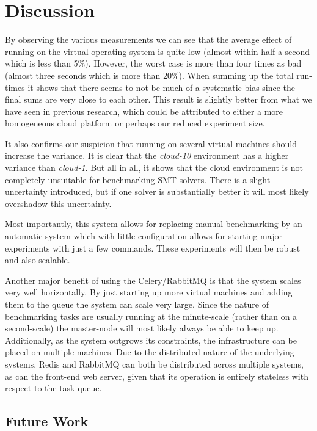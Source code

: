 \documentclass[a4paper]{IEEEtran}
\begin{document}
\section{Discussion}
By observing the various measurements we can see that the average
effect of running on the virtual operating system is quite low (almost
within half a second which is less than 5\%). However, the worst case
is more than four times as bad (almost three seconds which is more
than 20\%). When summing up the total run-times it shows that there
seems to not be much of a systematic bias since the final sums are
very close to each other. This result is slightly better from what we
have seen in previous research, which could be attributed to either a
more homogeneous cloud platform or perhaps our reduced experiment size.

It also confirms our suspicion that running on several virtual
machines should increase the variance. It is clear that the
\emph{cloud-10} environment has a higher variance than
\emph{cloud-1}. But all in all, it shows that the cloud environment is
not completely unsuitable for benchmarking SMT solvers. There is a
slight uncertainty introduced, but if one solver is substantially
better it will most likely overshadow this uncertainty.

Most importantly, this system allows for replacing manual benchmarking
by an automatic system which with little configuration allows for
starting major experiments with just a few commands. These experiments
will then be robust and also scalable. 

Another major benefit of using the Celery/RabbitMQ is that the system
scales very well horizontally. By just starting up more virtual
machines and adding them to the queue the system can scale very
large. Since the nature of benchmarking tasks are usually running at
the minute-scale (rather than on a second-scale) the master-node will
most likely always be able to keep up. Additionally, as the system
outgrows its constraints, the infrastructure can be placed on multiple
machines. Due to the distributed nature of the underlying systems,
Redis and RabbitMQ can both be distributed across multiple systems, as
can the front-end web server, given that its operation is entirely
stateless with respect to the task queue.

\subsection{Future Work}
\end{document}
